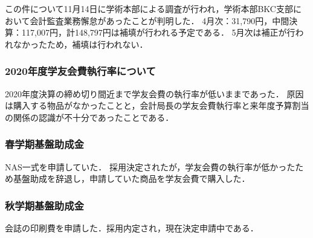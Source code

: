 この件について11月14日に学術本部による調査が行われ，学術本部BKC支部において会計監査業務懈怠があったことが判明した．
4月次：31,790円，中間決算：117,007円，計148,797円は補填が行われる予定である．
5月次は補正が行われなかったため，補填は行われない．


\subsubsection*{2020年度学友会費執行率について}
2020年度決算の締め切り間近まで学友会費の執行率が低いままであった．
原因は購入する物品がなかったことと，会計局長の学友会費執行率と来年度予算割当の関係の認識が不十分であったことである．


\subsubsection*{春学期基盤助成金}
NAS一式を申請していた．
採用決定されたが，学友会費の執行率が低かったため基盤助成を辞退し，申請していた商品を学友会費で購入した．


\subsubsection*{秋学期基盤助成金}
会誌の印刷費を申請した．採用内定され，現在決定申請中である．
